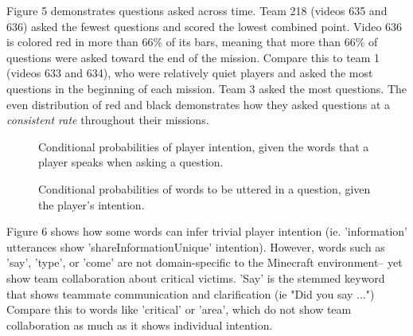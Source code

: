 Figure 5 demonstrates questions asked across time. Team 218 (videos 635 and 636) asked the fewest questions and scored the lowest combined point. Video 636 is colored red in more than 66\% of its bars, meaning that more than 66\% of questions were asked toward the end of the mission. Compare this to team 1 (videos 633 and 634), who were relatively quiet players and asked the most questions in the beginning of each mission. Team 3 asked the most questions. The even distribution of red and black demonstrates how they asked questions at a \emph{consistent rate} throughout their missions.


\clearpage

\begin{figure}[h!]
    \centering
    \caption{Conditional probabilities of player intention, given the words that a player speaks when asking a question.}
    \end{figure}
    
\begin{figure}[h!]
    \centering
    \caption{Conditional probabilities of words to be uttered in a question, given the player's intention.}
    \end{figure}
    Figure 6 shows how some words can infer trivial player intention (ie. 'information' utterances show 'shareInformationUnique' intention). However, words such as 'say', 'type', or 'come' are not domain-specific to the Minecraft environment-- yet show team collaboration about critical victims. 'Say' is the stemmed keyword that shows teammate communication and clarification (ie "Did you say ...") Compare this to words like 'critical' or 'area', which do not show team collaboration as much as it shows individual intention.  
    
